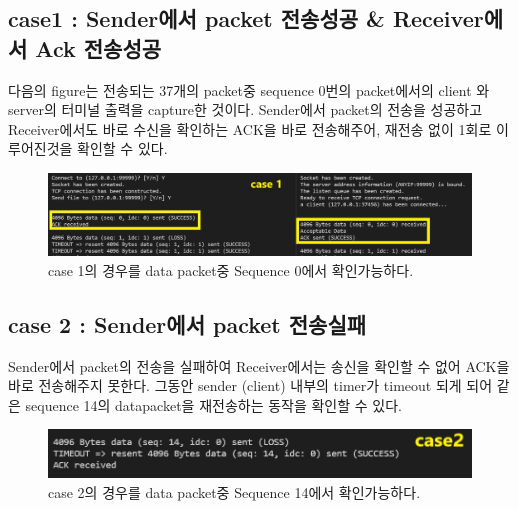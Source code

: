 	\subsection*{case1 : Sender에서 packet 전송성공 \& Receiver에서 Ack 전송성공}
	다음의 figure는 전송되는 37개의 packet중 sequence 0번의 packet에서의 client 와 server의 터미널 출력을 capture한 것이다. 
	Sender에서 packet의 전송을 성공하고 Receiver에서도 바로 수신을 확인하는 ACK을 바로 전송해주어, 재전송 없이 
	1회로 이루어진것을 확인할 수 있다.\\
\vspace{-2mm}
	\begin{figure}[!h]
		\centering
			\includegraphics[width=\textwidth]{image/case1.jpg}
			\caption{case 1의 경우를 data packet중 Sequence 0에서 확인가능하다.}
	\end{figure}
\vspace{-4mm}
\newpage
	\subsection*{case 2 : Sender에서 packet 전송실패}
	Sender에서 packet의 전송을 실패하여 Receiver에서는 송신을 확인할 수 없어 ACK을 바로 전송해주지 못한다. 
	그동안 sender (client) 내부의 timer가 timeout 되게 되어 같은 sequence 14의 datapacket을 재전송하는 동작을 확인할 수 있다.\\
\vspace{-2mm}
	\begin{figure}[!h]
		\centering
			\includegraphics[width=.6\textwidth]{image/case2.jpg}
			\caption{case 2의 경우를 data packet중 Sequence 14에서 확인가능하다.}
	\end{figure}
\vspace{-8mm}
